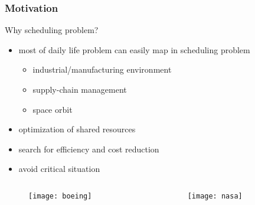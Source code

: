 \begin{frame} \frametitle{Motivation}
\pause
Why scheduling problem?
\begin{itemize}[<+->]
	\item most of daily life problem can easily map in scheduling problem
	\begin{itemize}
		\item industrial/manufacturing environment 
		\item supply-chain management
		\item space orbit 
	\end{itemize}
	\item optimization of shared resources
	\item search for efficiency and cost reduction
	\item avoid critical situation
\end{itemize}

\begin{columns}[c]
	\begin{column}[c]{6cm}
		\begin{figure}
			\centering
			\texttt{[image: boeing]}
		\end{figure}
	\end{column}
	\pause
	\begin{column}[c]{6cm}
		\begin{figure}
			\centering
			\texttt{[image: nasa]}
		\end{figure}
	\end{column}
\end{columns}

\end{frame}